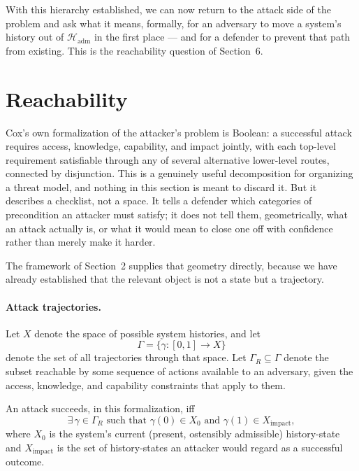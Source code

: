 \documentclass[11pt]{article}
\begin{document}
With this hierarchy established, we can now return to the attack side of the problem and ask what it means, formally, for an adversary to move a system's history out of $\mathcal{H}_{\mathrm{adm}}$ in the first place --- and for a defender to prevent that path from existing. This is the reachability question of Section~6.

\section{Reachability}

Cox's own formalization of the attacker's problem is Boolean: a successful attack requires access, knowledge, capability, and impact jointly, with each top-level requirement satisfiable through any of several alternative lower-level routes, connected by disjunction. This is a genuinely useful decomposition for organizing a threat model, and nothing in this section is meant to discard it. But it describes a checklist, not a space. It tells a defender which categories of precondition an attacker must satisfy; it does not tell them, geometrically, what an attack actually is, or what it would mean to close one off with confidence rather than merely make it harder.

The framework of Section~2 supplies that geometry directly, because we have already established that the relevant object is not a state but a trajectory.

\paragraph{Attack trajectories.} Let $X$ denote the space of possible system histories, and let
\begin{equation}
\Gamma = \{\gamma : [0,1] \to X\}
\end{equation}
denote the set of all trajectories through that space. Let $\Gamma_R \subseteq \Gamma$ denote the subset reachable by some sequence of actions available to an adversary, given the access, knowledge, and capability constraints that apply to them.

An attack succeeds, in this formalization, iff
\begin{equation}
\exists\, \gamma \in \Gamma_R \text{ such that } \gamma(0) \in X_0 \text{ and } \gamma(1) \in X_{\mathrm{impact}},
\end{equation}
where $X_0$ is the system's current (present, ostensibly admissible) history-state and $X_{\mathrm{impact}}$ is the set of history-states an attacker would regard as a successful outcome.
\end{document}
